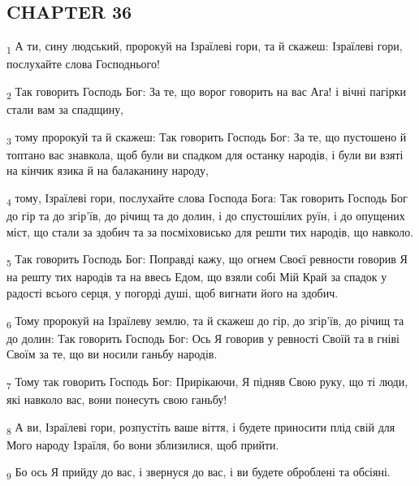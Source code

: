 \subsection{CHAPTER 36}
\begin{tcolorbox}
\textsubscript{1} А ти, сину людський, пророкуй на Ізраїлеві гори, та й скажеш: Ізраїлеві гори, послухайте слова Господнього!
\end{tcolorbox}
\begin{tcolorbox}
\textsubscript{2} Так говорить Господь Бог: За те, що ворог говорить на вас Ага! і вічні пагірки стали вам за спадщину,
\end{tcolorbox}
\begin{tcolorbox}
\textsubscript{3} тому пророкуй та й скажеш: Так говорить Господь Бог: За те, що пустошено й топтано вас знавкола, щоб були ви спадком для останку народів, і були ви взяті на кінчик язика й на балаканину народу,
\end{tcolorbox}
\begin{tcolorbox}
\textsubscript{4} тому, Ізраїлеві гори, послухайте слова Господа Бога: Так говорить Господь Бог до гір та до згір'їв, до річищ та до долин, і до спустошілих руїн, і до опущених міст, що стали за здобич та за посміховисько для решти тих народів, що навколо.
\end{tcolorbox}
\begin{tcolorbox}
\textsubscript{5} Так говорить Господь Бог: Поправді кажу, що огнем Своєї ревности говорив Я на решту тих народів та на ввесь Едом, що взяли собі Мій Край за спадок у радості всього серця, у погорді душі, щоб вигнати його на здобич.
\end{tcolorbox}
\begin{tcolorbox}
\textsubscript{6} Тому пророкуй на Ізраїлеву землю, та й скажеш до гір, до згір'їв, до річищ та до долин: Так говорить Господь Бог: Ось Я говорив у ревності Своїй та в гніві Своїм за те, що ви носили ганьбу народів.
\end{tcolorbox}
\begin{tcolorbox}
\textsubscript{7} Тому так говорить Господь Бог: Прирікаючи, Я підняв Свою руку, що ті люди, які навколо вас, вони понесуть свою ганьбу!
\end{tcolorbox}
\begin{tcolorbox}
\textsubscript{8} А ви, Ізраїлеві гори, розпустіть ваше віття, і будете приносити плід свій для Мого народу Ізраїля, бо вони зблизилися, щоб прийти.
\end{tcolorbox}
\begin{tcolorbox}
\textsubscript{9} Бо ось Я прийду до вас, і звернуся до вас, і ви будете оброблені та обсіяні.
\end{tcolorbox}
